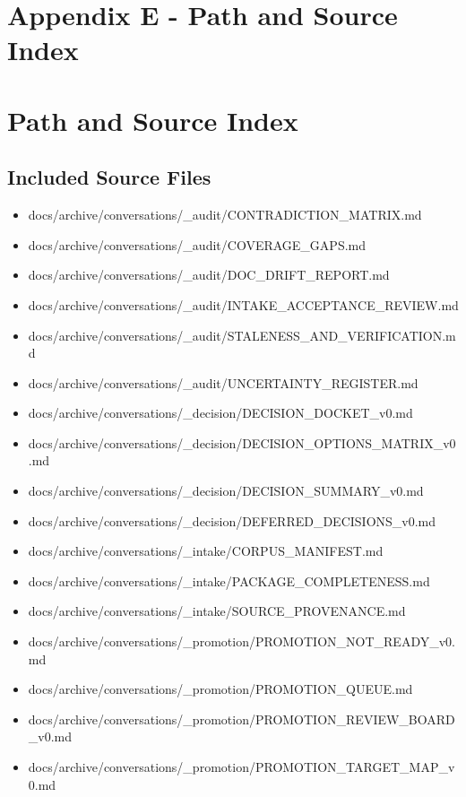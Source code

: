 \documentclass[11pt,a4paper]{report}
\begin{document}
\chapter{Appendix E - Path and Source Index}

\chapter{Path and Source Index}

\section{Included Source Files}

\begin{itemize}
\item docs/archive/conversations/\_audit/CONTRADICTION\_MATRIX.md
\item docs/archive/conversations/\_audit/COVERAGE\_GAPS.md
\item docs/archive/conversations/\_audit/DOC\_DRIFT\_REPORT.md
\item docs/archive/conversations/\_audit/INTAKE\_ACCEPTANCE\_REVIEW.md
\item docs/archive/conversations/\_audit/STALENESS\_AND\_VERIFICATION.md
\item docs/archive/conversations/\_audit/UNCERTAINTY\_REGISTER.md
\item docs/archive/conversations/\_decision/DECISION\_DOCKET\_v0.md
\item docs/archive/conversations/\_decision/DECISION\_OPTIONS\_MATRIX\_v0.md
\item docs/archive/conversations/\_decision/DECISION\_SUMMARY\_v0.md
\item docs/archive/conversations/\_decision/DEFERRED\_DECISIONS\_v0.md
\item docs/archive/conversations/\_intake/CORPUS\_MANIFEST.md
\item docs/archive/conversations/\_intake/PACKAGE\_COMPLETENESS.md
\item docs/archive/conversations/\_intake/SOURCE\_PROVENANCE.md
\item docs/archive/conversations/\_promotion/PROMOTION\_NOT\_READY\_v0.md
\item docs/archive/conversations/\_promotion/PROMOTION\_QUEUE.md
\item docs/archive/conversations/\_promotion/PROMOTION\_REVIEW\_BOARD\_v0.md
\item docs/archive/conversations/\_promotion/PROMOTION\_TARGET\_MAP\_v0.md

\end{itemize}
\end{document}
